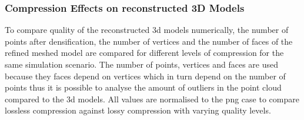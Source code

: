 \subsubsection{Compression Effects on reconstructed 3D Models}
To compare  quality of the reconstructed \gls{3d} models numerically, the number of points after densification, the number of vertices and the number of faces of the refined meshed model are compared for different levels of compression for the same simulation scenario. The number of points, vertices and faces are used because they faces depend on vertices which in turn depend on the number of points thus it is possible to analyse the amount of outliers in the point cloud compared to the \gls{3d} models. All values are normalised to the \gls{png} case to compare lossless compression against lossy compression with varying quality levels.

